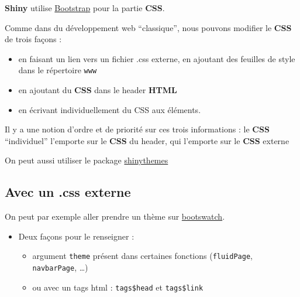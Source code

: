 \documentclass[]{article}
\newenvironment{Shaded}{\begin{snugshade}}{\end{snugshade}}
\newcommand{\KeywordTok}[1]{\textcolor[rgb]{0.13,0.29,0.53}{\textbf{#1}}}
\newcommand{\DataTypeTok}[1]{\textcolor[rgb]{0.13,0.29,0.53}{#1}}
\newcommand{\StringTok}[1]{\textcolor[rgb]{0.31,0.60,0.02}{#1}}
\newcommand{\CommentTok}[1]{\textcolor[rgb]{0.56,0.35,0.01}{\textit{#1}}}
\newcommand{\OperatorTok}[1]{\textcolor[rgb]{0.81,0.36,0.00}{\textbf{#1}}}
\newcommand{\NormalTok}[1]{#1}
\providecommand{\tightlist}{%
  \setlength{\itemsep}{0pt}\setlength{\parskip}{0pt}}
\begin{document}
\textbf{Shiny} utilise \href{http://getbootstrap.com/}{Bootstrap} pour
la partie \textbf{CSS}.

Comme dans du développement web ``classique'', nous pouvons modifier le
\textbf{CSS} de trois façons :

\begin{itemize}
\tightlist
\item
  en faisant un lien vers un fichier .css externe, en ajoutant des
  feuilles de style dans le répertoire \texttt{www}
\item
  en ajoutant du \textbf{CSS} dans le header \textbf{HTML}
\item
  en écrivant individuellement du CSS aux éléments.
\end{itemize}

Il y a une notion d'ordre et de priorité sur ces trois informations : le
\textbf{CSS} ``individuel'' l'emporte sur le \textbf{CSS} du header, qui
l'emporte sur le \textbf{CSS} externe

On peut aussi utiliser le package
\href{http://rstudio.github.io/shinythemes}{shinythemes}

\subsection{Avec un .css externe}\label{avec-un-.css-externe}

On peut par exemple aller prendre un thème sur
\href{http://bootswatch.com/}{bootswatch}.

\begin{itemize}
\tightlist
\item
  Deux façons pour le renseigner :

  \begin{itemize}
  \tightlist
  \item
    argument \texttt{theme} présent dans certaines fonctions
    (\texttt{fluidPage}, \texttt{navbarPage}, \ldots{})
  \item
    ou avec un tags html : \texttt{tags\$head} et \texttt{tags\$link}
  \end{itemize}
\end{itemize}

\begin{Shaded}
\end{Shaded}
\end{document}
